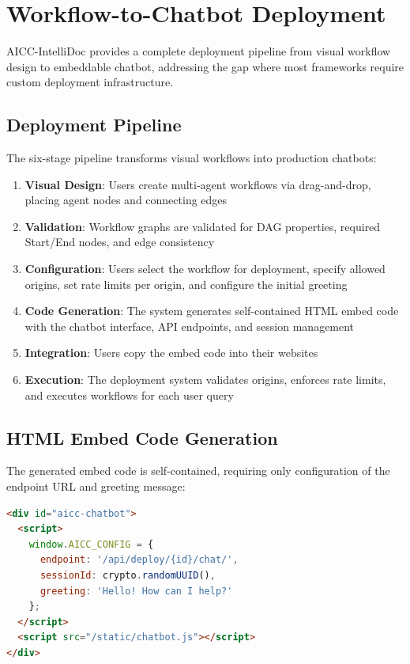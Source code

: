 \documentclass[11pt]{article}
\begin{document}
\section{Workflow-to-Chatbot Deployment}
\label{sec:deployment}

AICC-IntelliDoc provides a complete deployment pipeline from visual workflow design to embeddable chatbot, addressing the gap where most frameworks require custom deployment infrastructure.

\subsection{Deployment Pipeline}

The six-stage pipeline transforms visual workflows into production chatbots:

\begin{enumerate}
    \item \textbf{Visual Design}: Users create multi-agent workflows via drag-and-drop, placing agent nodes and connecting edges
    \item \textbf{Validation}: Workflow graphs are validated for DAG properties, required Start/End nodes, and edge consistency
    \item \textbf{Configuration}: Users select the workflow for deployment, specify allowed origins, set rate limits per origin, and configure the initial greeting
    \item \textbf{Code Generation}: The system generates self-contained HTML embed code with the chatbot interface, API endpoints, and session management
    \item \textbf{Integration}: Users copy the embed code into their websites
    \item \textbf{Execution}: The deployment system validates origins, enforces rate limits, and executes workflows for each user query
\end{enumerate}

\subsection{HTML Embed Code Generation}

The generated embed code is self-contained, requiring only configuration of the endpoint URL and greeting message:

\begin{lstlisting}[language=HTML,caption={Simplified generated embed code structure}]
<div id="aicc-chatbot">
  <script>
    window.AICC_CONFIG = {
      endpoint: '/api/deploy/{id}/chat/',
      sessionId: crypto.randomUUID(),
      greeting: 'Hello! How can I help?'
    };
  </script>
  <script src="/static/chatbot.js"></script>
</div>
\end{lstlisting}
\end{document}
